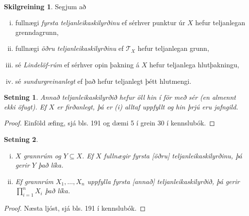 \documentclass[a4paper,icelandic]{book}
\theoremstyle{definition}
\newtheorem{skilgr}{Skilgreining}[section]
\theoremstyle{plain}
\newtheorem{setn}{Setning}[section]
\theoremstyle{remark}
\begin{document}
\paragraph{}
\begin{skilgr}
  Segjum að 
  \begin{enumerate}[(i)]
    \item fullnægi \emph{fyrsta teljanleikaskilyrðinu} ef sérhver punktur úr $X$ hefur teljanlegan
      grenndagrunn,
    \item fullnægi \emph{öðru teljanleikaskilyrðinu} ef $\mathcal T_X$ hefur teljanlegan grunn,
    \item sé \emph{Lindelöf-rúm} ef sérhver opin
      þakning á $X$ hefur teljanlega hlutþakningu,
    \item  sé \emph{sundurgreinanlegt} ef það
      hefur teljanlegt þétt hlutmengi.
  \end{enumerate}
\end{skilgr}
\begin{setn}
  Annað teljanleikaskilyrðið hefur öll hin í för með sér (en almennt
  ekki öfugt). Ef $X$ er firðanlegt, þá er (i) alltaf uppfyllt og hin
  þrjú eru jafngild.
\end{setn}
\begin{proof}
  Einföld æfing, sjá bls. 191 og dæmi 5 í grein 30 í kennslubók.
\end{proof}
\begin{setn}
  \begin{enumerate}[(i)]
    \item $X$ grannrúm og $Y\subseteq X$. Ef $X$ fullnægir fyrsta [öðru]
      teljanleikaskilyrðinu, þá gerir $Y$ það líka.
    \item Ef grannrúm $X_1,\dots,X_n$ uppfylla fyrsta [annað]
      teljanleikaskilyrðið, þá gerir $\prod_{i=1}^n X_i$ það líka.
  \end{enumerate}
\end{setn}
\begin{proof}
  Næsta ljóst, sjá bls. 191 í kennslubók.
\end{proof}
\end{document}
